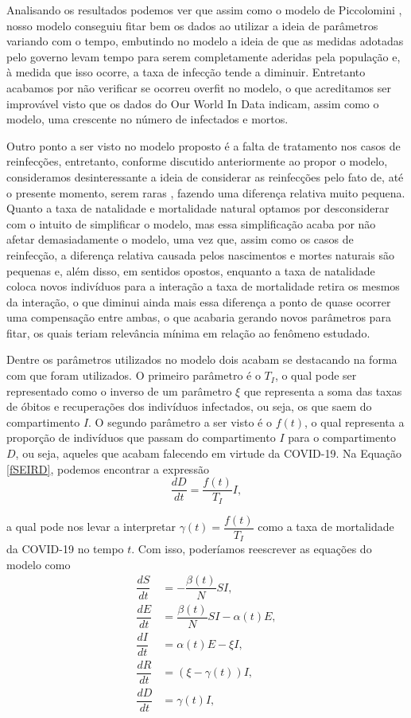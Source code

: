 \documentclass{article}
\begin{document}
Analisando os resultados podemos ver que assim como o modelo de Piccolomini \cite{piccolomini}, nosso modelo conseguiu fitar bem os dados ao utilizar a ideia de parâmetros variando com o tempo, embutindo no modelo a ideia de que as medidas adotadas pelo governo levam tempo para serem completamente aderidas pela população e, à medida que isso ocorre, a taxa de infecção tende a diminuir. Entretanto acabamos por não verificar se ocorreu overfit no modelo, o que acreditamos ser improvável visto que os dados do Our World In Data \cite{owid} indicam, assim como o modelo, uma crescente no número de infectados e mortos.

Outro ponto a ser visto no modelo proposto é a falta de tratamento nos casos de reinfecções, entretanto, conforme discutido anteriormente ao propor o modelo, consideramos desinteressante a ideia de considerar as reinfecções pelo fato de, até o presente momento, serem raras \cite{again} \cite{again2}, fazendo uma diferença relativa muito pequena. Quanto a taxa de natalidade e mortalidade natural optamos por desconsiderar com o intuito de simplificar o modelo, mas essa simplificação acaba por não afetar demasiadamente o modelo, uma vez que, assim como os casos de reinfecção, a diferença relativa causada pelos nascimentos e mortes naturais são pequenas e, além disso, em sentidos opostos, enquanto a taxa de natalidade coloca novos indivíduos para a interação a taxa de mortalidade retira os mesmos da interação, o que diminui ainda mais essa diferença a ponto de quase ocorrer uma compensação entre ambas, o que acabaria gerando novos parâmetros para fitar, os quais teriam relevância mínima em relação ao fenômeno estudado.

Dentre os parâmetros utilizados no modelo dois acabam se destacando na forma com que foram utilizados. O primeiro parâmetro é o $T_I$, o qual pode ser representado como o inverso de um parâmetro $\xi$ que representa a soma das taxas de óbitos e recuperações dos indivíduos infectados, ou seja, os que saem do compartimento $I$. O segundo parâmetro a ser visto é o $f(t)$, o qual representa a proporção de indivíduos que passam do compartimento $I$ para o compartimento $D$, ou seja, aqueles que acabam falecendo em virtude da COVID-19. Na Equação \ref{fSEIRD}, podemos encontrar a expressão
\[\dfrac{dD}{dt} = \dfrac{f(t)}{T_I}I,\]

\noindent a qual pode nos levar a interpretar $\gamma(t) = \dfrac{f(t)}{T_I}$ como a taxa de mortalidade da COVID-19 no tempo $t$. Com isso, poderíamos reescrever as equações do modelo como
\begin{equation}
    \begin{split}
        \dfrac{dS}{dt} & = -\dfrac{\beta(t)}{N}SI, \\
        \dfrac{dE}{dt} & = \dfrac{\beta(t)}{N}SI - \alpha(t) E, \\
        \dfrac{dI}{dt} & = \alpha(t) E - \xi I, \\
        \dfrac{dR}{dt} & = \left(\xi - \gamma(t)\right) I, \\
        \dfrac{dD}{dt} & = \gamma(t) I,
    \end{split}
\end{equation}
\end{document}
